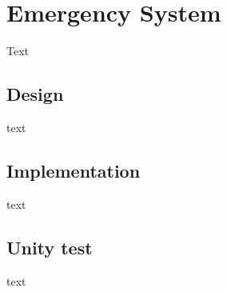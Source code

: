 \section{Emergency System}
Text

\subsection{Design}
text

\subsection{Implementation}
text

\subsection{Unity test}
text